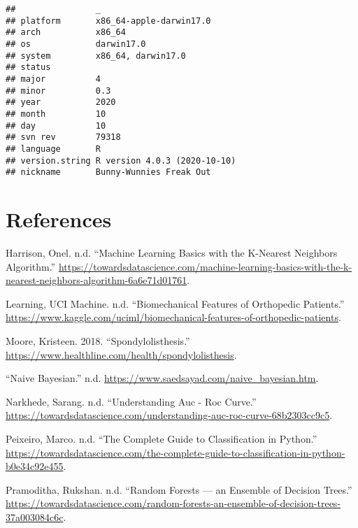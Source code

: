 \documentclass[
]{article}
\begin{document}
\begin{verbatim}
##                _                           
## platform       x86_64-apple-darwin17.0     
## arch           x86_64                      
## os             darwin17.0                  
## system         x86_64, darwin17.0          
## status                                     
## major          4                           
## minor          0.3                         
## year           2020                        
## month          10                          
## day            10                          
## svn rev        79318                       
## language       R                           
## version.string R version 4.0.3 (2020-10-10)
## nickname       Bunny-Wunnies Freak Out
\end{verbatim}

\hypertarget{references}{%
\section*{References}\label{references}}

\hypertarget{refs}{}
\leavevmode\hypertarget{ref-KNN2}{}%
Harrison, Onel. n.d. ``Machine Learning Basics with the K-Nearest
Neighbors Algorithm.''
\url{https://towardsdatascience.com/machine-learning-basics-with-the-k-nearest-neighbors-algorithm-6a6e71d01761}.

\leavevmode\hypertarget{ref-Data}{}%
Learning, UCI Machine. n.d. ``Biomechanical Features of Orthopedic
Patients.''
\url{https://www.kaggle.com/uciml/biomechanical-features-of-orthopedic-patients}.

\leavevmode\hypertarget{ref-Spody}{}%
Moore, Kristeen. 2018. ``Spondylolisthesis.''
\url{https://www.healthline.com/health/spondylolisthesis}.

\leavevmode\hypertarget{ref-NaiveBay}{}%
``Naive Bayesian.'' n.d.
\url{https://www.saedsayad.com/naive_bayesian.htm}.

\leavevmode\hypertarget{ref-ROCCurve}{}%
Narkhede, Sarang. n.d. ``Understanding Auc - Roc Curve.''
\url{https://towardsdatascience.com/understanding-auc-roc-curve-68b2303cc9c5}.

\leavevmode\hypertarget{ref-LDA2}{}%
Peixeiro, Marco. n.d. ``The Complete Guide to Classification in
Python.''
\url{https://towardsdatascience.com/the-complete-guide-to-classification-in-python-b0e34c92e455}.

\leavevmode\hypertarget{ref-RForest}{}%
Pramoditha, Rukshan. n.d. ``Random Forests --- an Ensemble of Decision
Trees.''
\url{https://towardsdatascience.com/random-forests-an-ensemble-of-decision-trees-37a003084c6c}.
\end{document}

